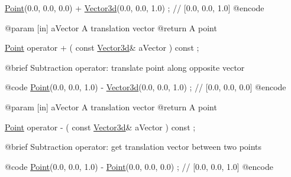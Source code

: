 \begin{DoxyCode}
                        \hyperlink{classostk_1_1math_1_1geom_1_1d3_1_1objects_1_1_point_ad9bee5dadb878200f859b20a34680ae5}{Point}(0.0, 0.0, 0.0) + \hyperlink{namespaceostk_1_1math_1_1obj_a18744cbf433bce59f6758d9fe3b1dff1}{Vector3d}(0.0, 0.0, 1.0) ; \textcolor{comment}{// [0.0, 0.0, 1.0]}
    @encode
   
    @param              [in] aVector A translation vector
    @\textcolor{keywordflow}{return}             A point

\hyperlink{classostk_1_1math_1_1geom_1_1d3_1_1objects_1_1_point_ad9bee5dadb878200f859b20a34680ae5}{Point}                   operator +                                  (   \textcolor{keyword}{const}   
      \hyperlink{namespaceostk_1_1math_1_1obj_a18744cbf433bce59f6758d9fe3b1dff1}{Vector3d}&                   aVector                                     ) \textcolor{keyword}{const} ;

    @brief              Subtraction \textcolor{keyword}{operator}: translate point along opposite vector
   
    @code
                        \hyperlink{classostk_1_1math_1_1geom_1_1d3_1_1objects_1_1_point_ad9bee5dadb878200f859b20a34680ae5}{Point}(0.0, 0.0, 1.0) - \hyperlink{namespaceostk_1_1math_1_1obj_a18744cbf433bce59f6758d9fe3b1dff1}{Vector3d}(0.0, 0.0, 1.0) ; \textcolor{comment}{// [0.0, 0.0, 0.0]}
    @encode
   
    @param              [in] aVector A translation vector
    @\textcolor{keywordflow}{return}             A point

\hyperlink{classostk_1_1math_1_1geom_1_1d3_1_1objects_1_1_point_ad9bee5dadb878200f859b20a34680ae5}{Point}                   operator -                                  (   \textcolor{keyword}{const}   
      \hyperlink{namespaceostk_1_1math_1_1obj_a18744cbf433bce59f6758d9fe3b1dff1}{Vector3d}&                   aVector                                     ) \textcolor{keyword}{const} ;

    @brief              Subtraction \textcolor{keyword}{operator}: \textcolor{keyword}{get} translation vector between two points
   
    @code
                        \hyperlink{classostk_1_1math_1_1geom_1_1d3_1_1objects_1_1_point_ad9bee5dadb878200f859b20a34680ae5}{Point}(0.0, 0.0, 1.0) - \hyperlink{classostk_1_1math_1_1geom_1_1d3_1_1objects_1_1_point_ad9bee5dadb878200f859b20a34680ae5}{Point}(0.0, 0.0, 0.0)  ; \textcolor{comment}{// [0.0, 0.0, 1.0]}
    @encode
   

\end{DoxyCode}
